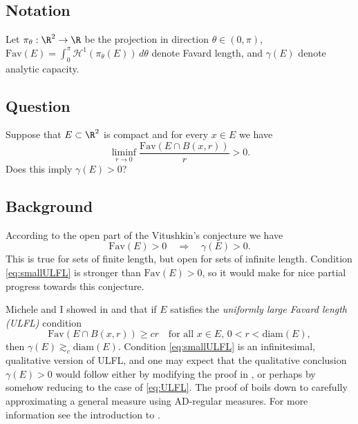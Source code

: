 %
%	
%
%

\subsection*{Notation}
Let $\pi_\theta:\R^2\to\R$ be the projection in direction $\theta\in (0,\pi)$, $\text{Fav}(E)=\int_0^\pi \mathcal{H}^1(\pi_\theta(E))\, d\theta$ denote Favard length, and $\gamma(E)$ denote analytic capacity. 

\subsection*{Question}
Suppose that $E\subset\R^2$ is compact and for every $x\in E$ we have
\begin{equation}\label{eq:smallULFL}
	\liminf_{r\to 0}\frac{\text{Fav}(E\cap B(x,r))}{r} > 0. 
\end{equation}
Does this imply $\gamma(E)>0$?

\subsection*{Background}
According to the open part of the Vitushkin's conjecture we have
\begin{equation*}
	\text{Fav}(E)>0\quad\Rightarrow\quad\gamma(E)>0.
\end{equation*}
This is true for sets of finite length, but open for sets of infinite length. Condition \eqref{eq:smallULFL} is stronger than $\text{Fav}(E)>0$, so it would make for nice partial progress towards this conjecture.

Michele and I showed in  and  that if $E$ satisfies the \textit{uniformly large Favard length (ULFL)} condition
\begin{equation}\label{eq:ULFL}
	\text{Fav}(E\cap B(x,r))\ge cr \quad \text{for all }x\in E,\, 0<r<\text{diam}(E),
\end{equation}
then $\gamma(E)\gtrsim_c \text{diam}(E)$. Condition \eqref{eq:smallULFL} is an infinitesimal, qualitative version of ULFL, and one may expect that the qualitative conclusion $\gamma(E)>0$ would follow either by modifying the proof in , or perhaps by somehow reducing to the case of \eqref{eq:ULFL}. The proof of  boils down to carefully approximating a general measure using AD-regular measures. For more information see the introduction to .


\hrulefill
